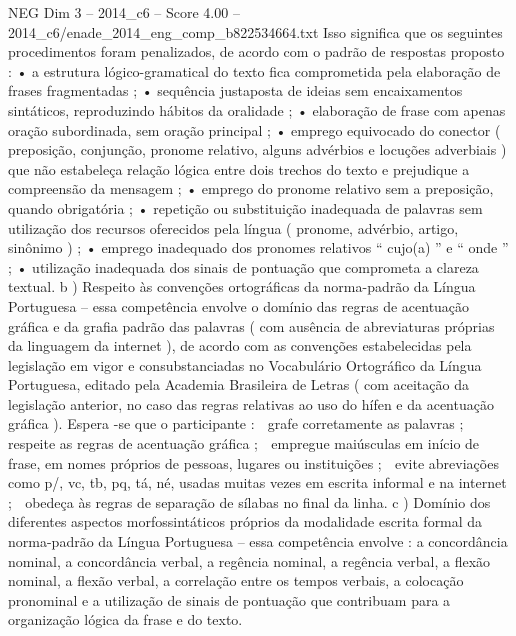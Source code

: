 \begin{textsample}{NEG Dim 3 – 2014\_c6 – Score 4.00 – 2014\_c6/enade\_2014\_eng\_comp\_b822534664.txt}
Isso significa que os seguintes procedimentos foram penalizados, de acordo com o padrão de respostas proposto : • a estrutura lógico-gramatical do texto fica comprometida pela elaboração de frases fragmentadas ; • sequência justaposta de ideias sem encaixamentos sintáticos, reproduzindo hábitos da oralidade ; • elaboração de frase com apenas oração subordinada, sem oração principal ; • emprego equivocado do conector ( preposição, conjunção, pronome relativo, alguns advérbios e locuções adverbiais ) que não estabeleça relação lógica entre dois trechos do texto e prejudique a compreensão da mensagem ; • emprego do pronome relativo sem a preposição, quando obrigatória ; • repetição ou substituição inadequada de palavras sem utilização dos recursos oferecidos pela língua ( pronome, advérbio, artigo, sinônimo ) ; • emprego inadequado dos pronomes relativos “ cujo(a) ” e “ onde ” ; • utilização inadequada dos sinais de pontuação que comprometa a clareza textual. b ) Respeito às convenções ortográficas da norma-padrão da Língua Portuguesa – essa competência envolve o domínio das regras de acentuação gráfica e da grafia padrão das palavras ( com ausência de abreviaturas próprias da linguagem da internet ), de acordo com as convenções estabelecidas pela legislação em vigor e consubstanciadas no Vocabulário Ortográfico da Língua Portuguesa, editado pela Academia Brasileira de Letras ( com aceitação da legislação anterior, no caso das regras relativas ao uso do hífen e da acentuação gráfica ).
Espera -se que o participante :  grafe corretamente as palavras ;  respeite as regras de acentuação gráfica ;  empregue maiúsculas em início de frase, em nomes próprios de pessoas, lugares ou instituições ;  evite abreviações como p/, vc, tb, pq, tá, né, usadas muitas vezes em escrita informal e na internet ;  obedeça às regras de separação de sílabas no final da linha. c ) Domínio dos diferentes aspectos morfossintáticos próprios da modalidade escrita formal da norma-padrão da Língua Portuguesa – essa competência envolve : a concordância nominal, a concordância verbal, a regência nominal, a regência verbal, a flexão nominal, a flexão verbal, a correlação entre os tempos verbais, a colocação pronominal e a utilização de sinais de pontuação que contribuam para a organização lógica da frase e do texto.

\end{textsample}
